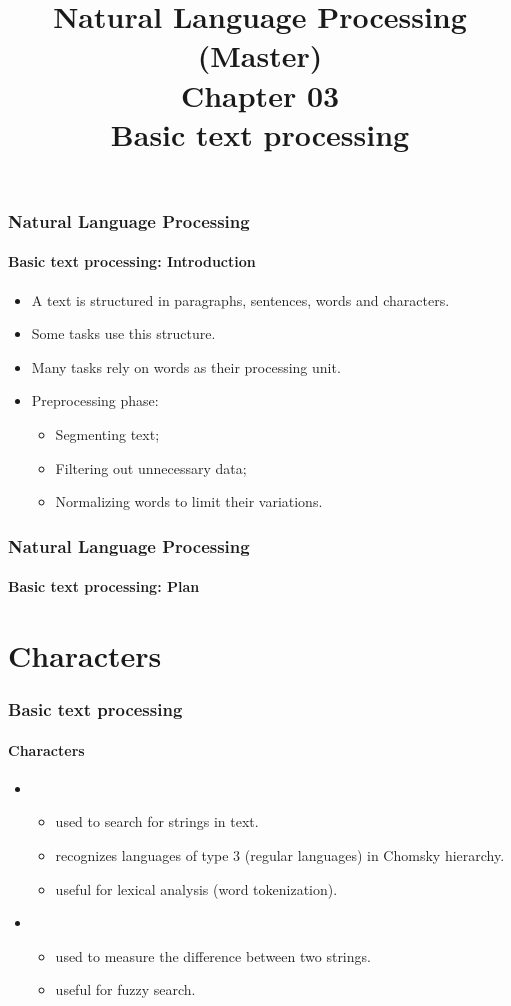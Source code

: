 \documentclass[xcolor=table]{beamer}
\title[ESI - NLP(master): 03- Basic text processing]%
{Natural Language Processing (Master)\\Chapter 03\\Basic text processing}
\begin{document}
	
\begin{frame}
\frametitle{Natural Language Processing}
\framesubtitle{Basic text processing: Introduction}

\begin{itemize}
	\item A text is structured in paragraphs, sentences, words and characters.
	\item Some tasks use this structure.
	\item Many tasks rely on words as their processing unit.
	\item Preprocessing phase:
	\begin{itemize}
		\item Segmenting text;
		\item Filtering out unnecessary data;
		\item Normalizing words to limit their variations.
	\end{itemize}
\end{itemize}

\end{frame}


\begin{frame}
\frametitle{Natural Language Processing}
\framesubtitle{Basic text processing: Plan}

\begin{multicols}{2}
\tableofcontents
\end{multicols}
\end{frame}

\section{Characters}

\begin{frame}
\frametitle{Basic text processing}
\framesubtitle{Characters}

\begin{itemize}
	\item {}
	\begin{itemize}
		\item used to search for strings in text.
		\item recognizes languages of type 3 (regular languages) in Chomsky hierarchy.
		\item useful for lexical analysis (word tokenization).
	\end{itemize}
	\item {}
	\begin{itemize}
		\item used to measure the difference between two strings.
		\item useful for fuzzy search.
	\end{itemize}
\end{itemize}

\end{frame}
\end{document}
